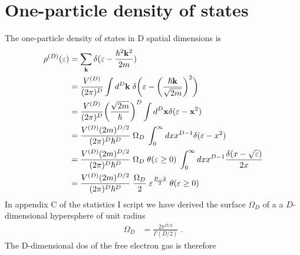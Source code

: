 \section{One-particle density of states } \label{app:dos}

The one-particle density of states in D spatial dimensions is
%
\begin{align*}
\rho^{(D)}(\varepsilon) &= \sum_{\mathbf k}\delta(\varepsilon-\frac{\hbar^{2} \mathbf k^{2}}{2m})\\
 &= \frac{V^{(D)}}{(2\pi)^{D}}\int d^{D}\mathbf k\; \delta\bigg(\varepsilon-\bigg(\frac{\hbar \mathbf k}{\sqrt{2m}}\bigg)^{2}\bigg)\\
&=\frac{V^{(D)}}{(2\pi)^{D}}\bigg( \frac{\sqrt{2m}}{\hbar}\bigg)^{D}\int d^{D}\mathbf x \delta(\varepsilon-\mathbf x^{2})\\
&=\frac{ V^{(D)} (2m)^{D/2}}{(2\pi)^{D} \hbar^{D}}\;\Omega_{D} \;\int_{0}^{\infty} d x x^{D-1}\delta(\varepsilon-x^{2})\\
&=\frac{V^{(D)} (2m)^{D/2}}{(2\pi)^{D} \hbar^{D}}\;\Omega_{D}
\;\theta(\varepsilon\ge 0) \;\int_{0}^{\infty} d x x^{D-1}\frac{\delta(x-\sqrt{\varepsilon})}{2 x}\\
&=\frac{V^{(D)} (2m)^{D/2}}{(2\pi)^{D} \hbar^{D}}\;\frac{\Omega_{D}}{2} \;
\varepsilon^{\frac{D-2}{2}}\;\theta(\varepsilon\ge 0)\\
\end{align*}
%
In appendix C of the statistics I script we have derived the surface $\Omega_{D}$ of a
a $D$-dimensional hypersphere of unit radius
%
\begin{align*}
\Omega_{D} &= \frac{2\pi^{D/2}}{\Gamma(D/2)}\;.
\end{align*}
%
The D-dimensional dos of the free electron gas is therefore
%
%

